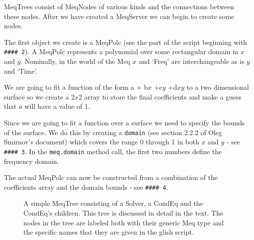 \documentclass[10pt]{article}
\begin{document}
MeqTrees consist of MeqNodes of various kinds and the connections 
between these nodes. After we have created a MeqServer we can begin
to create some nodes. 

The first object we create is a MeqPolc (see
the part of the script beginning with {\tt \#\#\#\# 2}).
A MeqPolc represents a polynomial over some rectangular domain in $x$ and
$y$. Nominally, in the world of the Meq $x$ and `Freq' are
interchangeable as is $y$ and `Time'.

We are going to fit a function of the form a + b$x$ +c$y$ +d$xy$ to a
two dimensional surface so we create a 2$x$2 array to store the final
coefficients and make a guess that $a$ will have a value of 1.

Since we are going to fit a function over a surface we need to
specify the bounds of the surface. We do this by creating a  {\tt domain}
(see section 2.2.2 of Oleg Smirnov's \cite{smirnov} document) which
covers the range 0 through 1 in both $x$ and $y$ - see {\tt \#\#\#\# 3}. 
In the {\tt meq.domain} method call, the first two numbers define
the frequency domain.

The actual MeqPolc can now be constructed from a combination of the 
coefficients array and the domain bounds - see  {\tt \#\#\#\# 4}.

\begin{figure}
{\par\centering
{}
\par}
\caption {A simple MeqTree consisting of a Solver, a CondEq
and the CondEq's children. This tree is discussed in detail in the
text. The nodes in the tree are labeled both with their generic
Meq type and the specific names that they are given in the glish 
script.} 
\label{fig:tree}
\end{figure}
\end{document}
